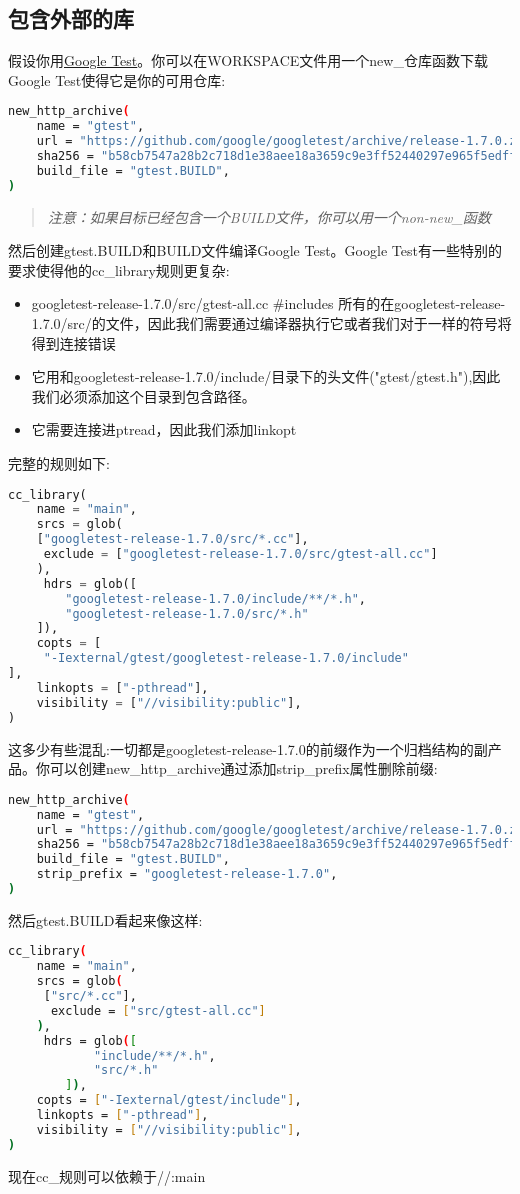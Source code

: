 \subsection{包含外部的库}
假设你用\href{https://github.com/google/googletest}{Google Test}。你可以在WORKSPACE文件用一个new\_仓库函数下载Google Test使得它是你的可用仓库:
\begin{lstlisting}[language=Bash]
new_http_archive(
    name = "gtest",
    url = "https://github.com/google/googletest/archive/release-1.7.0.zip",
    sha256 = "b58cb7547a28b2c718d1e38aee18a3659c9e3ff52440297e965f5edffe34b6d0",
    build_file = "gtest.BUILD",
)
\end{lstlisting}
\begin{quote}
	\emph{注意：如果目标已经包含一个BUILD文件，你可以用一个non-new\_函数}
\end{quote}
然后创建gtest.BUILD和BUILD文件编译Google Test。Google Test有一些特别的要求使得他的cc\_library规则更复杂:
\begin{itemize}
	\item googletest-release-1.7.0/src/gtest-all.cc \#includes 所有的在googletest-release-1.7.0/src/的文件，因此我们需要通过编译器执行它或者我们对于一样的符号将得到连接错误
	\item 它用和googletest-release-1.7.0/include/目录下的头文件("gtest/gtest.h"),因此我们必须添加这个目录到包含路径。
	\item 它需要连接进ptread，因此我们添加linkopt
\end{itemize}
完整的规则如下:
\begin{lstlisting}[language=Python]
cc_library(
    name = "main",
    srcs = glob(
    ["googletest-release-1.7.0/src/*.cc"],
     exclude = ["googletest-release-1.7.0/src/gtest-all.cc"]
    ),
     hdrs = glob([
        "googletest-release-1.7.0/include/**/*.h",
        "googletest-release-1.7.0/src/*.h"
    ]),
    copts = [
     "-Iexternal/gtest/googletest-release-1.7.0/include"
],
    linkopts = ["-pthread"],
    visibility = ["//visibility:public"],
)
\end{lstlisting}
这多少有些混乱:一切都是googletest-release-1.7.0的前缀作为一个归档结构的副产品。你可以创建new\_http\_archive通过添加strip\_prefix属性删除前缀:
\begin{lstlisting}[language=Bash]
new_http_archive(
    name = "gtest",
    url = "https://github.com/google/googletest/archive/release-1.7.0.zip",
    sha256 = "b58cb7547a28b2c718d1e38aee18a3659c9e3ff52440297e965f5edffe34b6d0",
    build_file = "gtest.BUILD",
    strip_prefix = "googletest-release-1.7.0",
)
\end{lstlisting}
然后gtest.BUILD看起来像这样:
\begin{lstlisting}[language=Bash]
cc_library(
    name = "main",
    srcs = glob(
     ["src/*.cc"],
      exclude = ["src/gtest-all.cc"]
    ),
     hdrs = glob([
	        "include/**/*.h",
	        "src/*.h"
	    ]),
    copts = ["-Iexternal/gtest/include"],
    linkopts = ["-pthread"],
    visibility = ["//visibility:public"],
)
\end{lstlisting}
现在cc\_规则可以依赖于\@gtest//:main

